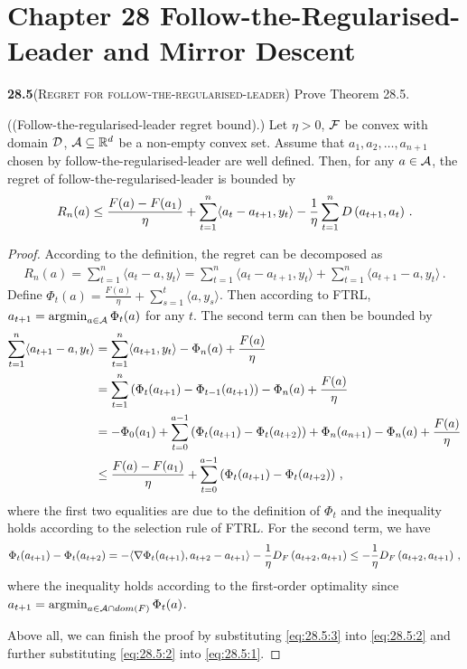 \chapter*{Chapter 28 Follow-the-Regularised-Leader and Mirror Descent}
\label{sec:28}


\noindent\textbf{28.5}\textsc{(Regret for follow-the-regularised-leader)} Prove Theorem 28.5.

\begin{theorem}[Theorem 28.5]{((Follow-the-regularised-leader regret bound).)}
Let $\eta>0$, $\mathcal{F}$ be convex with domain $\mathcal{D}$, $\mathcal{A}\subseteq \mathbb{R}^d$ be a non-empty convex set. Assume that $a_1,a_2,\ldots,a_{n+1}$ chosen by follow-the-regularised-leader are well defined. Then, for any $a\in\mathcal{A}$, the regret of follow-the-regularised-leader is bounded by
\begin{align*}
    R_n(a) \le \frac{F(a)-F(a_1)}{\eta} + \sum_{t=1}^n \langle a_t-a_{t+1}, y_t \rangle - \frac{1}{\eta} \sum_{t=1}^n D\left( a_{t+1},a_t \right) \,.
\end{align*}
\end{theorem}

\begin{proof}
According to the definition, the regret can be decomposed as 
\begin{align}
    R_n(a) = \sum_{t=1}^n \langle a_t - a, y_t\rangle = \sum_{t=1}^n \langle a_t - a_{t+1}, y_t\rangle + \sum_{t=1}^n \langle a_{t+1}- a, y_t\rangle \,.  \label{eq:28.5:1}
\end{align}
Define $\Phi_t(a) = \frac{F(a)}{\eta} + \sum_{s=1}^t \langle a, y_s\rangle$. 
Then according to FTRL, $a_{t+1} = \operatorname*{argmin}_{a\in\mathcal{A}}\Phi_t(a)$ for any $t$. The second term can then be bounded by
\begin{align}
    \sum_{t=1}^n \langle a_{t+1}-a, y_t \rangle &= \sum_{t=1}^n \langle a_{t+1},y_t \rangle - \Phi_n(a) + \frac{F(a)}{\eta}  \notag\\
    &= \sum_{t=1}^n\left( \Phi_t(a_{t+1}) - \Phi_{t-1}(a_{t+1}) \right) - \Phi_n(a) + \frac{F(a)}{\eta}  \notag \\
    &= -\Phi_0(a_1) + \sum_{t=0}^{a-1} \left( \Phi_t(a_{t+1}) -\Phi_t(a_{t+2})  \right) + \Phi_n(a_{n+1}) - \Phi_n(a) + \frac{F(a)}{\eta}   \notag \\
    &\le \frac{F(a)-F(a_1)}{\eta} + \sum_{t=0}^{a-1} \left( \Phi_t(a_{t+1}) -\Phi_t(a_{t+2})  \right) \label{eq:28.5:2} \,,
\end{align}
where the first two equalities are due to the definition of $\Phi_t$ and the inequality holds according to the selection rule of FTRL. 
For the second term, we have
\begin{align}
    \Phi_t(a_{t+1}) -\Phi_t(a_{t+2})  = -\langle  \nabla \Phi_t(a_{t+1}), a_{t+2}-a_{t+1}  \rangle -\frac{1}{\eta} D_F\left(a_{t+2}, a_{t+1}\right) \le -\frac{1}{\eta} D_F\left(a_{t+2}, a_{t+1}\right) \label{eq:28.5:3} \,,
\end{align}
where the inequality holds according to the first-order optimality since $a_{t+1} = \operatorname*{argmin} _{a\in\mathcal{A} \cap dom(F)} \Phi_t(a)$. 

Above all, we can finish the proof by substituting \eqref{eq:28.5:3} into \eqref{eq:28.5:2} and further substituting \eqref{eq:28.5:2} into \eqref{eq:28.5:1}.  


\end{proof}